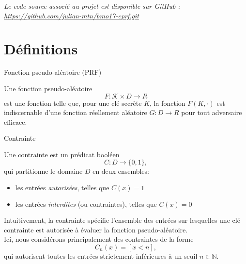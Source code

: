 \documentclass[9pt]{extarticle}
\begin{document}
\small \textit{Le code source associé au projet est disponible sur GitHub : 
\href{https://github.com/julian-mtn/bmo17-cprf.git}{https://github.com/julian-mtn/bmo17-cprf.git}}


\newpage
\tableofcontents

\section{Définitions}

\begin{defbox}{Fonction pseudo-aléatoire (PRF)}

Une fonction pseudo-aléatoire
\[
F : \mathcal K \times D \rightarrow R
\]
est une fonction telle que, pour une clé secrète $K$, la fonction $F(K,\cdot)$ est
indiscernable d’une fonction réellement aléatoire
$G : D \rightarrow R$ pour tout adversaire efficace.
\end{defbox}

\begin{defbox}{Contrainte}

Une contrainte est un prédicat booléen
\[
C : D \rightarrow \{0,1\},
\]
qui partitionne le domaine $D$ en deux ensembles:
\begin{itemize}
\item les entrées \emph{autorisées}, telles que $C(x)=1$
\item les entrées \emph{interdites} (ou contraintes), telles que $C(x)=0$
\end{itemize}

Intuitivement, la contrainte spécifie l’ensemble des entrées sur lesquelles une clé
contrainte est autorisée à évaluer la fonction pseudo-aléatoire.\\

Ici, nous considérons principalement des contraintes de la forme
\[
C_n(x) = [x < n],
\]
qui autorisent toutes les entrées strictement inférieures à un seuil $n \in \mathbb{N}$.
\end{defbox}
\end{document}
